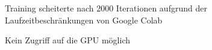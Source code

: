 \begin{figure}[H]
	\centering
	\caption{Training scheiterte nach 2000 Iterationen aufgrund der Laufzeitbeschränkungen von Google Colab}
\end{figure}

\begin{figure}[H]
	\centering
	\caption{Kein Zugriff auf die GPU möglich} 
\end{figure}
